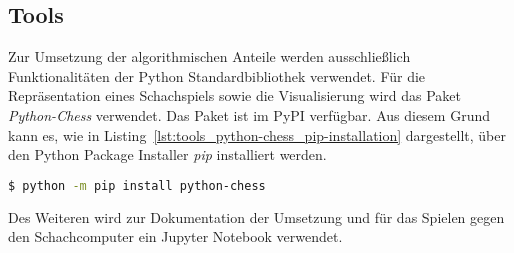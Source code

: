 \subsection{Tools}

Zur Umsetzung der algorithmischen Anteile werden ausschließlich Funktionalitäten der Python Standardbibliothek verwendet.
Für die Repräsentation eines Schachspiels sowie die Visualisierung wird das Paket \textit{Python-Chess} verwendet.
Das Paket ist im \ac{PyPI} verfügbar.
Aus diesem Grund kann es, wie in Listing~\ref{lst:tools_python-chess_pip-installation} dargestellt, über den Python Package Installer \textit{pip} installiert werden.

\bigskip

\begin{lstlisting}[caption={Installation des Python-Chess Pakets via pip}, captionpos=b, label={lst:tools_python-chess_pip-installation}, language=sh]
$ python -m pip install python-chess
\end{lstlisting}

\noindent Des Weiteren wird zur Dokumentation der Umsetzung und für das Spielen gegen den Schachcomputer ein Jupyter Notebook verwendet.
